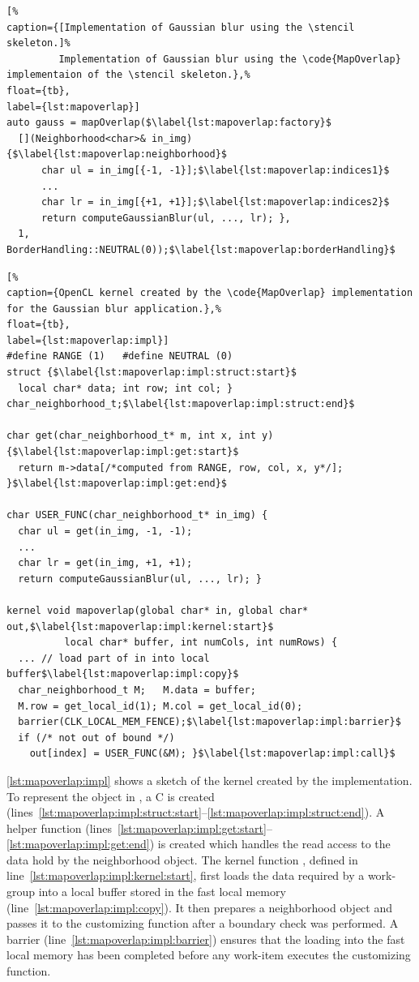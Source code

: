 \begin{lstlisting}[%
caption={[Implementation of Gaussian blur using the \stencil skeleton.]%
         Implementation of Gaussian blur using the \code{MapOverlap} implementaion of the \stencil skeleton.},%
float={tb},
label={lst:mapoverlap}]
auto gauss = mapOverlap($\label{lst:mapoverlap:factory}$
  [](Neighborhood<char>& in_img) {$\label{lst:mapoverlap:neighborhood}$
      char ul = in_img[{-1, -1}];$\label{lst:mapoverlap:indices1}$
      ...
      char lr = in_img[{+1, +1}];$\label{lst:mapoverlap:indices2}$
      return computeGaussianBlur(ul, ..., lr); },
  1, BorderHandling::NEUTRAL(0));$\label{lst:mapoverlap:borderHandling}$
\end{lstlisting}


\begin{lstlisting}[%
caption={OpenCL kernel created by the \code{MapOverlap} implementation for the Gaussian blur application.},%
float={tb},
label={lst:mapoverlap:impl}]
#define RANGE (1)   #define NEUTRAL (0)
struct {$\label{lst:mapoverlap:impl:struct:start}$
  local char* data; int row; int col; } char_neighborhood_t;$\label{lst:mapoverlap:impl:struct:end}$

char get(char_neighborhood_t* m, int x, int y) {$\label{lst:mapoverlap:impl:get:start}$
  return m->data[/*computed from RANGE, row, col, x, y*/]; }$\label{lst:mapoverlap:impl:get:end}$

char USER_FUNC(char_neighborhood_t* in_img) {
  char ul = get(in_img, -1, -1);
  ...
  char lr = get(in_img, +1, +1);
  return computeGaussianBlur(ul, ..., lr); }

kernel void mapoverlap(global char* in, global char* out,$\label{lst:mapoverlap:impl:kernel:start}$
          local char* buffer, int numCols, int numRows) {
  ... // load part of in into local buffer$\label{lst:mapoverlap:impl:copy}$
  char_neighborhood_t M;   M.data = buffer;
  M.row = get_local_id(1); M.col = get_local_id(0);
  barrier(CLK_LOCAL_MEM_FENCE);$\label{lst:mapoverlap:impl:barrier}$
  if (/* not out of bound */)
    out[index] = USER_FUNC(&M); }$\label{lst:mapoverlap:impl:call}$
\end{lstlisting}

\autoref{lst:mapoverlap:impl} shows a sketch of the \OpenCL kernel created by the  implementation.
To represent the  object in \OpenCL, a C  is created (lines~\ref{lst:mapoverlap:impl:struct:start}--\ref{lst:mapoverlap:impl:struct:end}).
A helper function  (lines~\ref{lst:mapoverlap:impl:get:start}--\ref{lst:mapoverlap:impl:get:end}) is created which handles the read access to the data hold by the neighborhood object.
The kernel function , defined in line~\ref{lst:mapoverlap:impl:kernel:start}, first loads the data required by a work-group into a local buffer stored in the fast local \GPU memory (line~\ref{lst:mapoverlap:impl:copy}).
It then prepares a neighborhood object and passes it to the customizing function after a boundary check was performed.
A barrier (line~\ref{lst:mapoverlap:impl:barrier}) ensures that the loading into the fast local memory has been completed before any work-item executes the customizing function.

